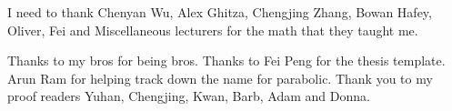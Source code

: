 I need to thank Chenyan Wu,  Alex Ghitza,  Chengjing Zhang, Bowan Hafey, Oliver, Fei and Miscellaneous lecturers
for the math that they taught me. 

Thanks to my bros for being bros. Thanks to Fei Peng for the thesis template. Arun Ram for helping track down the name for parabolic. Thank you to my proof readers Yuhan, Chengjing, Kwan, Barb, Adam and Donna.
